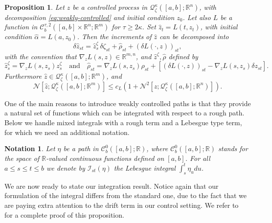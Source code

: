 \documentclass[12pt,reqno]{amsart}
\numberwithin{equation}{section}  %
\newcommand{\der}{\delta}
\newcommand{\1}{{\bf 1}}
\newcommand{\2}{{\bf 2}}
\newcommand{\bzeta}{{\zeta}}
\newcommand{\R}{\mathbb R}
\newcommand{\cac}{\mathcal C}
\newcommand{\ci}{\mathcal I}
\newcommand{\cn}{\mathcal N}
\newcommand{\cq}{\mathcal Q}
\newcommand{\al}{\alpha}
\newcommand{\ka}{\kappa}
\newcommand{\lp}{\left(}
\newcommand{\rp}{\right)}
\newcommand{\lc}{\left[}
\newcommand{\rc}{\right]}
\newtheorem{notation}[theorem]{Notation}
\newtheorem{proposition}[theorem]{Proposition}
\theoremstyle{remark}
\theoremstyle{remark}
\newcommand{\beq}{\begin{equation}}
\newcommand{\eeq}{\end{equation}}
\begin{document}
\begin{proposition}\label{prop:smooth_of_weak}
Let $z$ be a controlled process in $\cq_{\zeta}^{\ka}([a,b];\R^n)$, with decomposition \eqref{eq:weakly-controlled} and initial condition $z_0$. Let also $L$ be a function in $\cac_b^{\tau, 2} ([a,b] \times \R^n;\R^{m})$ for $\tau \geq 2\ka$. Set $\hat{z}_t = L(t, z_t)$, with initial condition $\hat{\al} = L(a, z_0)$. Then the increments of $\hat{z}$ can be decomposed into
$$
\der \hat{z}_{st} = \hat{z}_s^{\bzeta} \, \der \zeta_{st} + \hat{\rho}_{st} + (\der L(\cdot, z))_{st},
$$
with the convention that $\nabla_z L(s, z)\in\R^{m,n}$, and $\hat{z}^{\zeta}, \hat{\rho}$ defined by
\beq\label{eq:6-terms}
\hat{z}_s^{\zeta} = \nabla_z L(s, z_s) z_s^{\zeta} \quad \text{and} \quad \hat{\rho}_{st}=\nabla_z L(s,z_s) \rho_{st} +      \lc  {\lp \der L(\cdot ,z) \rp}_{st} -\nabla_z L(s,z_s) \der z_{st} \rc . 
\eeq
Furthermore $\hat{z} \in \cq_{\zeta}^{\ka} ([a,b]; \R^m)$, and
\beq\label{eq:6-a}
\cn \lc \hat{z}; \cq_{\zeta}^{\ka}([a,b];\R^m) \rc \leq c_L \lp 1 + \cn^2\lc z; \cq_{\zeta}^{\ka} ([a,b]; \R^n) \rc \rp.
\eeq
\end{proposition}


One of the main reasons to introduce weakly controlled paths is that they provide a natural set of functions which can be integrated with respect to a rough path. Below we handle mixed integrals with a rough term and a Lebesgue type term, for which we need an additional notation.
\begin{notation}\label{not:leb-int}
Let $\eta$ be a path in $\cac_b^0([a,b];\R)$, where $\cac_b^0([a,b];\R)$ stands for the space of $\R$-valued continuous functions defined on $[a,b]$. For all $a \leq s \leq t \leq b$ we denote by $\ci_{st}(\eta)$ the Lebesgue integral $\int_s^t \eta_u du$.
\end{notation}
We are now ready to state our integration result. Notice again that our formulation of the integral differs from the standard one, due to the fact that we are paying extra attention to the drift term in our control setting. We refer to~\cite{CHT} for a complete proof of this proposition.
\end{document}
